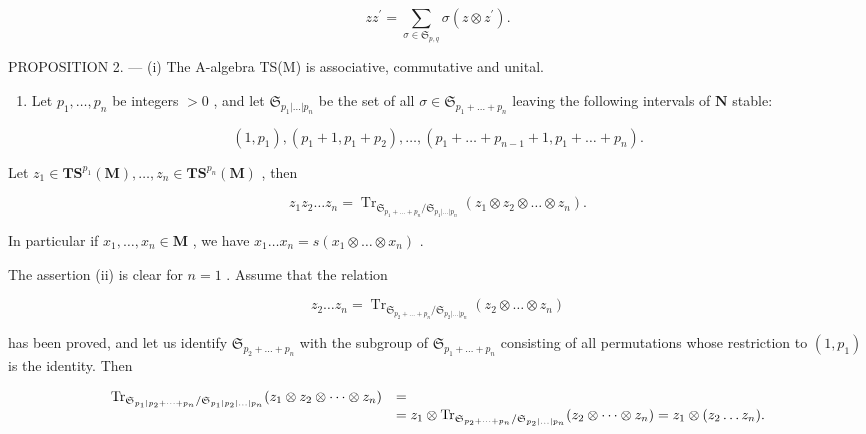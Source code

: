 \[
z z ^ {\prime} = \sum_ {\sigma \in \mathfrak {S} _ {p, q}} \sigma (z \otimes z ^ {\prime}).\tag{5}
\]

PROPOSITION 2. --- (i) The A-algebra TS(M) is associative, commutative and unital.

\begin{enumerate}
\def\labelenumi{(\roman{enumi})}
\setcounter{enumi}{1}
\tightlist
\item
  Let \(p_1, \ldots, p_n\) be integers \(> 0\) , and let \(\mathfrak{S}_{p_1 | \ldots | p_n}\) be the set of all \(\sigma \in \mathfrak{S}_{p_1 + \ldots + p_n}\) leaving the following intervals of \(\mathbf{N}\) stable:
\end{enumerate}

\[
\left(1, p _ {1}\right), \left(p _ {1} + 1, p _ {1} + p _ {2}\right), \dots , \left(p _ {1} + \dots + p _ {n - 1} + 1, p _ {1} + \dots + p _ {n}\right).
\]

Let \(z_{1}\in \mathbf{T}\mathbf{S}^{p_{1}}(\mathbf{M}),\ldots ,z_{n}\in \mathbf{T}\mathbf{S}^{p_{n}}(\mathbf{M})\) , then

\[
z _ {1} z _ {2} \dots z _ {n} = \operatorname{Tr} _ {\mathfrak {S} _ {p _ {1} + \dots + p _ {n}} / \mathfrak {S} _ {p _ {1} | \dots | p _ {n}}} (z _ {1} \otimes z _ {2} \otimes \dots \otimes z _ {n}).
\]

In particular if \(x_1, \ldots, x_n \in \mathbf{M}\) , we have \(x_1 \ldots x_n = s(x_1 \otimes \ldots \otimes x_n)\) .

The assertion (ii) is clear for \(n = 1\) . Assume that the relation

\[
z _ {2} \dots z _ {n} = \operatorname{Tr} _ {\mathfrak {S} _ {p _ {2} + \dots + p _ {n}} / \mathfrak {S} _ {p _ {2} | \dots | p _ {n}}} (z _ {2} \otimes \dots \otimes z _ {n})
\]

has been proved, and let us identify \(\mathfrak{S}_{p_2 + \ldots + p_n}\) with the subgroup of \(\mathfrak{S}_{p_1 + \ldots + p_n}\) consisting of all permutations whose restriction to \((1, p_1)\) is the identity. Then

\[
\begin{array}{r l} \operatorname{Tr} _ {\mathfrak {S} _ {p _ {1} | p _ {2} + \dots + p _ {n}} / \mathfrak {S} _ {p _ {1} | p _ {2} | \dots | p _ {n}}} (z _ {1} \otimes z _ {2} \otimes \dots \otimes z _ {n}) & = \\ & = z _ {1} \otimes \operatorname{Tr} _ {\mathfrak {S} _ {p _ {2} + \dots + p _ {n}} / \mathfrak {S} _ {p _ {2} | \dots | p _ {n}}} (z _ {2} \otimes \dots \otimes z _ {n}) = z _ {1} \otimes (z _ {2} \dots z _ {n}). \end{array}
\]

